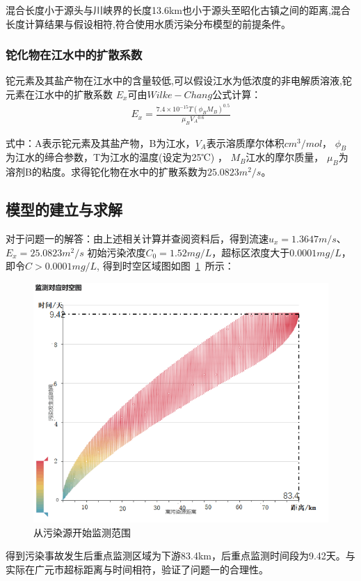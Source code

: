 \documentclass{whutmod}
\begin{document}
	混合长度小于源头与川峡界的长度13.6km也小于源头至昭化古镇之间的距离,混合长度计算结果与假设相符,符合使用水质污染分布模型的前提条件。
	
	
	\subsubsection{铊化物在江水中的扩散系数}
	铊元素及其盐产物在江水中的含量较低,可以假设江水为低浓度的非电解质溶液,铊元素在江水中的扩散系数  $E_{x}$可由$Wilke-Chang$公式计算：
	\begin{gather}
	E_{x}=\frac{7.4\times 10^{-15}T(\phi _{B}M_{B})^{0.5}}{\mu _{B}V{_{A}}^{0.6}}
	\end{gather}
	
	式中：A表示铊元素及其盐产物，B为江水，$V_{A}$表示溶质摩尔体积$cm^{3}/mol$， 
	$\phi_{B}$为江水的缔合参数，T为江水的温度(设定为25℃) ，
	$M_{B}$江水的摩尔质量，
	$\mu_{B}$为溶剂B的粘度。求得铊化物在水中的扩散系数为$25.0823m^{2}/s$。
	\subsection{模型的建立与求解}
对于问题一的解答：由上述相关计算并查阅资料后，得到流速$u_{x}=1.3647m/s$、 $E_{x}=25.0823m^{2}/s$ 初始污染浓度$C_{0}=1.52mg/L$，超标区浓度大于$0.0001mg/L$，即令$C>0.0001mg/L$, 得到时空区域图如图~\ref{skfbt}~所示：
\begin{figure}[H]
	\centering
	\includegraphics[width=.8\textwidth]{figures/zaojiatu.png}
	\caption{从污染源开始监测范围}\label{skfbt}
\end{figure}
得到污染事故发生后重点监测区域为下游83.4km，后重点监测时间段为9.42天。与实际在广元市超标距离与时间相符，验证了问题一的合理性。
~\\
\end{document}
